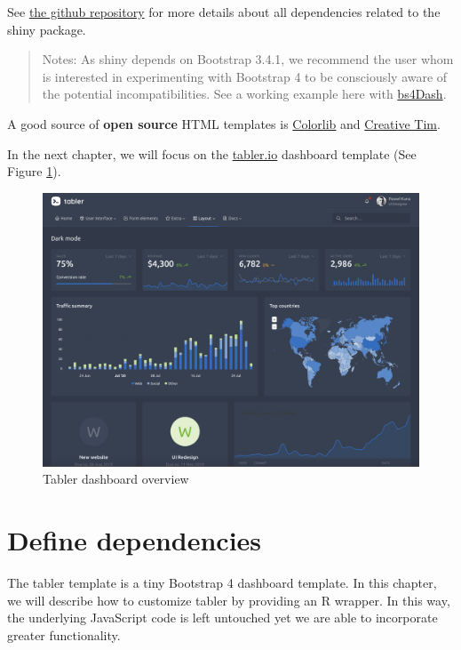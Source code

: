 \documentclass[
]{book}
\begin{document}
See \href{https://github.com/rstudio/shiny/tree/master/inst/www/shared}{the github repository} for more details about all dependencies related to the shiny package.

\begin{quote}
Notes: As shiny depends on Bootstrap 3.4.1, we recommend the user whom is interested in experimenting with Bootstrap 4 to be consciously aware of the potential incompatibilities. See a working example here with \href{https://github.com/RinteRface/bs4Dash}{bs4Dash}.
\end{quote}

A good source of \textbf{open source} HTML templates is \href{https://colorlib.com}{Colorlib} and \href{https://www.creative-tim.com/bootstrap-themes/free}{Creative Tim}.

In the next chapter, we will focus on the \href{https://preview-dev.tabler.io/layout-dark.html}{tabler.io} dashboard template (See Figure \ref{fig:tabler-dark}).

\begin{figure}
\includegraphics[width=34.33in]{images/practice/tabler-dark} \caption{Tabler dashboard overview}\label{fig:tabler-dark}
\end{figure}

\hypertarget{custom-templates-dependencies}{%
\chapter{Define dependencies}\label{custom-templates-dependencies}}

The tabler template is a tiny Bootstrap 4 dashboard template. In this chapter, we will describe how to customize tabler by providing an R wrapper. In this way, the underlying JavaScript code is left untouched yet we are able to incorporate greater functionality.
\end{document}
